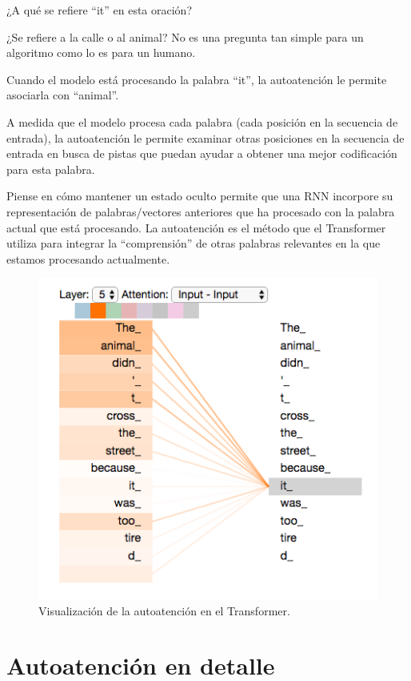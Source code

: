 ¿A qué se refiere ``it'' en esta oración?

¿Se refiere a la calle o al animal? No es una pregunta tan simple para un algoritmo como lo es para un humano.

Cuando el modelo está procesando la palabra ``it'', la autoatención le permite asociarla con ``animal''.

A medida que el modelo procesa cada palabra (cada posición en la secuencia de entrada), la autoatención le permite examinar otras posiciones en la secuencia de entrada en busca de pistas que puedan ayudar a obtener una mejor codificación para esta palabra.

Piense en cómo mantener un estado oculto permite que una RNN incorpore su representación de palabras/vectores anteriores que ha procesado con la palabra actual que está procesando. La autoatención es el método que el Transformer utiliza para integrar la ``comprensión'' de otras palabras relevantes en la que estamos procesando actualmente.

\begin{figure}[h]
  \centering
  \includegraphics[scale=0.35]{pics/transformer_self-attention_visualization.png}
  \caption{Visualización de la autoatención en el Transformer.}
\end{figure}

\section{Autoatención en detalle}


